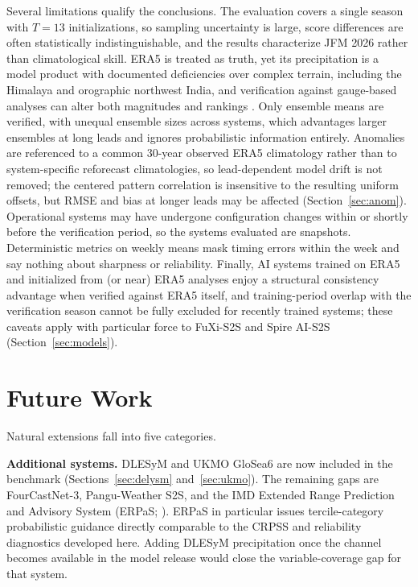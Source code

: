 \documentclass[11pt,a4paper]{article}
\begin{document}
Several limitations qualify the conclusions. The evaluation covers a
single season with $T=13$ initializations, so sampling uncertainty is
large, score differences are often statistically indistinguishable,
and the results characterize JFM 2026 rather than climatological
skill. ERA5 is treated as truth, yet its precipitation is a model
product with documented deficiencies over complex terrain, including
the Himalaya and orographic northwest India, and verification against
gauge-based analyses can alter both magnitudes and rankings
\citep{hersbach2020,pai2014}. Only ensemble means are verified, with
unequal ensemble sizes across systems, which advantages larger
ensembles at long leads and ignores probabilistic information
entirely. Anomalies are referenced to a common 30-year observed ERA5
climatology rather than to system-specific reforecast climatologies, so
lead-dependent model drift is not removed; the centered pattern
correlation is insensitive to the resulting uniform offsets, but RMSE
and bias at longer leads may be affected (Section~\ref{sec:anom}).
Operational systems may have undergone
configuration changes within or shortly before the verification
period, so the systems evaluated are snapshots. Deterministic metrics
on weekly means mask timing errors within the week and say nothing
about sharpness or reliability. Finally, AI systems trained on ERA5
and initialized from (or near) ERA5 analyses enjoy a structural
consistency advantage when verified against ERA5 itself, and
training-period overlap with the verification season cannot be fully
excluded for recently trained systems; these caveats apply with
particular force to FuXi-S2S and Spire AI-S2S
(Section~\ref{sec:models}).

\section{Future Work}\label{sec:future}

Natural extensions fall into five categories.

\textbf{Additional systems.} DLESyM and UKMO GloSea6 are now included
in the benchmark (Sections~\ref{sec:delysm} and~\ref{sec:ukmo}).
The remaining gaps are FourCastNet-3, Pangu-Weather S2S, and the IMD Extended
Range Prediction and Advisory System (ERPaS;
\citealt{pattanaik2019}). ERPaS in particular issues tercile-category
probabilistic guidance directly comparable to the CRPSS and reliability
diagnostics developed here. Adding DLESyM precipitation once the channel
becomes available in the model release would close the variable-coverage gap
for that system.
\end{document}
